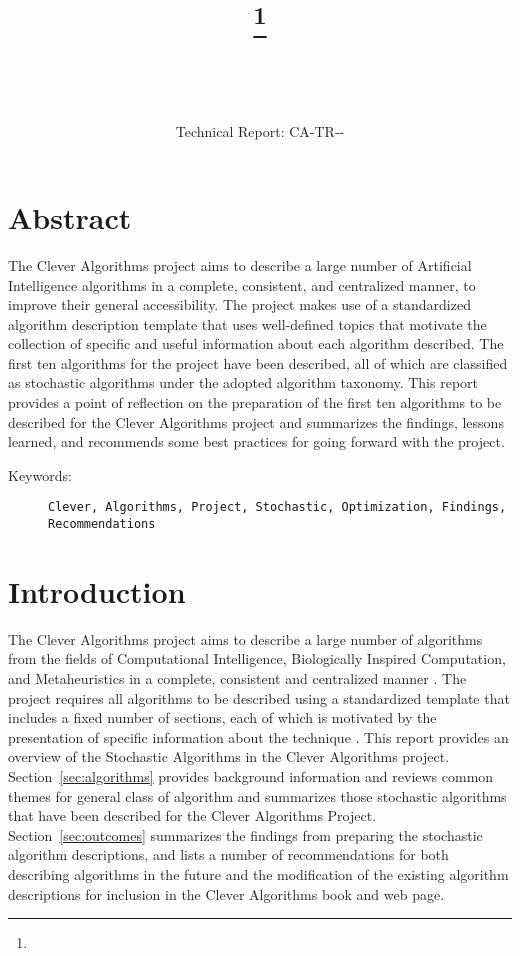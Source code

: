 \documentclass[a4paper, 11pt]{article}
\title{{\myreporttitle}\footnote{\myreportlicense}}
\author{\myreportauthor\\{\myreportemail}\\\small\myreportproject}
\date{\myreportfulldate\\{\small{Technical Report: CA-TR-{\myreportdate}-\myreportversion}}}
\begin{document}
\maketitle

\section*{Abstract} 
The Clever Algorithms project aims to describe a large number of Artificial Intelligence algorithms in a complete, consistent, and centralized manner, to improve their general accessibility. 
The project makes use of a standardized algorithm description template that uses well-defined topics that motivate the collection of specific and useful information about each algorithm described.
The first ten algorithms for the project have been described, all of which are classified as stochastic algorithms under the adopted algorithm taxonomy.
This report provides a point of reflection on the preparation of the first ten algorithms to be described for the Clever Algorithms project and summarizes the findings, lessons learned, and recommends some best practices for going forward with the project.

\begin{description}
	\item[Keywords:] {\small\texttt{Clever, Algorithms, Project, Stochastic, Optimization, Findings, Recommendations}}
\end{description} 

\section{Introduction}
\label{sec:introduction}
The Clever Algorithms project aims to describe a large number of algorithms from the fields of Computational Intelligence, Biologically Inspired Computation, and Metaheuristics in a complete, consistent and centralized manner \cite{Brownlee2010}.
The project requires all algorithms to be described using a standardized template that includes a fixed number of sections, each of which is motivated by the presentation of specific information about the technique \cite{Brownlee2010a}.
This report provides an overview of the Stochastic Algorithms in the Clever Algorithms project. 
Section~\ref{sec:algorithms} provides background information and reviews common themes for general class of algorithm and summarizes those stochastic algorithms that have been described for the Clever Algorithms Project.
Section~\ref{sec:outcomes} summarizes the findings from preparing the stochastic algorithm descriptions, and lists a number of recommendations for both describing algorithms in the future and the modification of the existing algorithm descriptions for inclusion in the Clever Algorithms book and web page.
\end{document}
